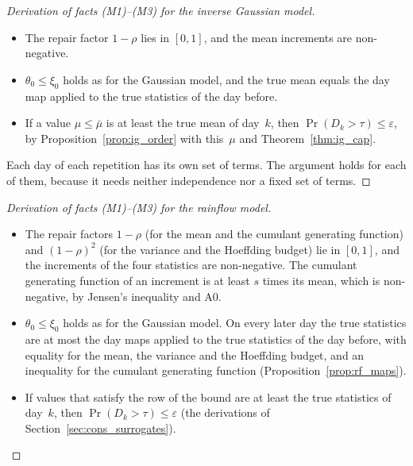 \documentclass[11pt,a4paper]{article}
\theoremstyle{plain}
\theoremstyle{definition}
\theoremstyle{remark}
\begin{document}
\label{drv:mfacts_ig}
\begin{proof}[Derivation of facts (M1)--(M3) for the inverse Gaussian model]
\begin{itemize}
  \item[(M1)] The repair factor $1-\rho$ lies in $[0, 1]$, and the mean increments are non-negative.
  \item[(M2)] $\theta_0 \le \xi_0$ holds as for the Gaussian model, and the true mean equals the day map applied to the true statistics of the day before.
  \item[(M3)] If a value $\mu \le \bar\mu$ is at least the true mean of day~$k$, then $\Pr(D_k > \tau) \le \varepsilon$, by Proposition~\ref{prop:ig_order} with this~$\mu$ and Theorem~\ref{thm:ig_cap}.
\end{itemize}
Each day of each repetition has its own set of terms.
The argument holds for each of them, because it needs neither independence nor a fixed set of terms.
\end{proof}

\label{drv:mfacts_rf}
\begin{proof}[Derivation of facts (M1)--(M3) for the rainflow model]
\begin{itemize}
  \item[(M1)] The repair factors $1-\rho$ (for the mean and the cumulant generating function) and $(1-\rho)^2$ (for the variance and the Hoeffding budget) lie in $[0, 1]$, and the increments of the four statistics are non-negative.
    The cumulant generating function of an increment is at least $s$ times its mean, which is non-negative, by Jensen's inequality and A0.
  \item[(M2)] $\theta_0 \le \xi_0$ holds as for the Gaussian model.
    On every later day the true statistics are at most the day maps applied to the true statistics of the day before, with equality for the mean, the variance and the Hoeffding budget, and an inequality for the cumulant generating function (Proposition~\ref{prop:rf_maps}).
  \item[(M3)] If values that satisfy the row of the bound are at least the true statistics of day~$k$, then $\Pr(D_k > \tau) \le \varepsilon$ (the derivations of Section~\ref{sec:cons_surrogates}).
\end{itemize}
\end{proof}
\end{document}
